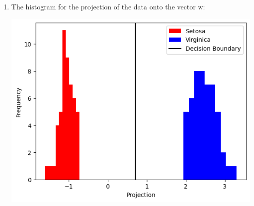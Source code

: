 \documentclass[12pt]{article}
\begin{document}
\begin{enumerate}[leftmargin=*]
    \item The histogram for the projection of the data onto the vector w:
    \begin{center}
        \includegraphics{img/iris.png}
    \end{center}
\end{enumerate}
\end{document}
